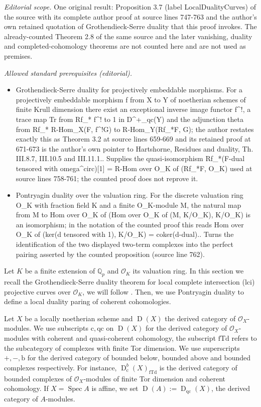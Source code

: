 \documentclass[10pt,a4paper]{amsart}
\newcommand{\rb}{\mathrm{b}}
\newcommand{\rc}{\mathrm{c}}
\newcommand{\qc}{\mathrm{qc}}
\newcommand{\fTd}{\mathrm{fTd}}
\numberwithin{equation}{section}
\theoremstyle{definition}
\newcommand{\bb}[1]{\mathbb{#1}}
\newcommand{\n}[1]{\mathcal{#1}}
\newcommand{\s}[1]{\mathscr{#1}}
\DeclareMathOperator{\D}{D}
\DeclareMathOperator{\Spec}{Spec}
\begin{document}
\noindent\textit{Editorial scope.} One original result: Proposition 3.7 (label LocalDualityCurves) of the source with its complete author proof at source lines 747-763 and the author's own retained quotation of Grothendieck-Serre duality that this proof invokes. The already-counted Theorem 2.8 of the same source and the later vanishing, duality and completed-cohomology theorems are not counted here and are not used as premises.\par\medskip
\noindent\textit{Allowed standard prerequisites (editorial).}\begin{itemize}
\item Grothendieck-Serre duality for projectively embeddable morphisms. For a projectively embeddable morphism f from X to Y of noetherian schemes of finite Krull dimension there exist an exceptional inverse image functor f\textasciicircum{}!, a trace map Tr from Rf\_* f\textasciicircum{}! to 1 in D\textasciicircum{}+\_qc(Y) and the adjunction theta from Rf\_* R-Hom\_X(F, f\textasciicircum{}!G) to R-Hom\_Y(Rf\_*F, G); the author restates exactly this as Theorem 3.2 at source lines 659-669 and its retained proof at 671-673 is the author's own pointer to Hartshorne, Residues and duality, Th. III.8.7, III.10.5 and III.11.1.. Supplies the quasi-isomorphism Rf\_*(F-dual tensored with omega\textasciicircum{}circ)[1] = R-Hom over O\_K of (Rf\_*F, O\_K) used at source lines 758-761; the counted proof does not reprove it.
\item Pontryagin duality over the valuation ring. For the discrete valuation ring O\_K with fraction field K and a finite O\_K-module M, the natural map from M to Hom over O\_K of (Hom over O\_K of (M, K/O\_K), K/O\_K) is an isomorphism; in the notation of the counted proof this reads Hom over O\_K of (ker(d tensored with 1), K/O\_K) = coker(d-dual).. Turns the identification of the two displayed two-term complexes into the perfect pairing asserted by the counted proposition (source line 762).
\end{itemize}\medskip
Let $K$ be a finite extension of $\bb{Q}_p$ and $\n{O}_K$ its valuation ring. In this section we recall the Grothendieck-Serre duality theorem for local complete intersection (lci) projective curves over $\n{O}_K$, we will follow \cite{hartshorne1966residues}. Then, we use Pontryagin duality to define a local duality paring of coherent cohomologies.

Let $X$ be a locally noetherian scheme and $\D(X)$ the derived category of $\s{O}_X$\nobreakdash-mod\-ules. We use subscripts $\rc, \qc$ on $\D(X)$ for the derived category of $\s{O}_{X}$\nobreakdash-modules with coherent and quasi-coherent cohomology, the subscript $\fTd$ refers to the subcategory of complexes with finite Tor dimension. We use superscripts $+,-,\rb$ for the derived category of bounded below, bounded above and bounded complexes respectively. For instance, $\D_{\rc}^b(X)_{\fTd}$ is the derived category of bounded complexes of $\s{O}_{X}$-modules of finite Tor dimension and coherent cohomology. If $X=\Spec A$ is affine, we set $\D(A):=\D_{\qc}(X)$, the derived category of $A$-modules.
\end{document}
